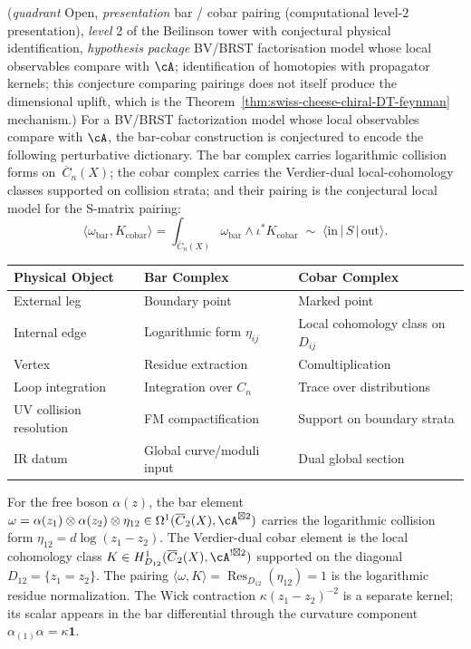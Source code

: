 \begin{conjecture}
\label{conj:physical-pairing}
\textup{(}\emph{quadrant} Open, \emph{presentation} bar / cobar pairing
\textup{(}computational level-$2$ presentation\textup{)},
\emph{level} 2 of the Beilinson tower with conjectural physical
identification, \emph{hypothesis package} BV/BRST factorisation model
whose local observables compare with $\cA$; identification of homotopies
with propagator kernels; this conjecture comparing pairings does not
itself produce the dimensional uplift, which is the
Theorem~\ref{thm:swiss-cheese-chiral-DT-feynman} mechanism.\textup{)}
For a BV/BRST factorization model whose local observables compare with
$\cA$, the bar-cobar construction is conjectured to encode the following
perturbative dictionary.  The bar complex carries logarithmic
collision forms on~$\overline{C}_n(X)$; the cobar complex carries the
Verdier-dual local-cohomology classes supported on collision strata; and
their pairing is the conjectural local model for the S-matrix pairing:
\[
\langle \omega_{\text{bar}}, K_{\text{cobar}} \rangle
= \int_{\overline{C}_n(X)}
\omega_{\text{bar}} \wedge \iota^* K_{\text{cobar}}
\;\sim\;
\langle \text{in} \,|\, S \,|\, \text{out} \rangle.
\]

\begin{center}
\begin{tabular}{lll}
\toprule
\textbf{Physical Object} & \textbf{Bar Complex} & \textbf{Cobar Complex} \\
\midrule
External leg & Boundary point & Marked point \\
Internal edge & Logarithmic form $\eta_{ij}$ & Local cohomology class on $D_{ij}$ \\
Vertex & Residue extraction & Comultiplication \\
Loop integration & Integration over $C_n$ & Trace over distributions \\
UV collision resolution & FM compactification & Support on boundary strata \\
IR datum & Global curve/moduli input & Dual global section \\
\bottomrule
\end{tabular}
\end{center}
\end{conjecture}

\begin{example}
For the free boson $\alpha(z)$, the bar element
$\omega = \alpha(z_1) \otimes \alpha(z_2) \otimes \eta_{12}
\in \Omega^1(\overline{C}_2(X), \cA^{\boxtimes 2})$
carries the logarithmic collision form
$\eta_{12} = d\log(z_1-z_2)$.  The Verdier-dual
cobar element is the local cohomology class
$K \in H^1_{D_{12}}(\overline{C}_2(X), \cA^{!\boxtimes 2})$
supported on the diagonal $D_{12} = \{z_1 = z_2\}$. The pairing
$\langle \omega, K \rangle
= \operatorname{Res}_{D_{12}}(\eta_{12}) = 1$
is the logarithmic residue normalization.  The Wick contraction
$\kappa(z_1-z_2)^{-2}$ is a separate kernel; its scalar appears in the
bar differential through the curvature component
$\alpha_{(1)}\alpha=\kappa\mathbf{1}$.
\end{example}

